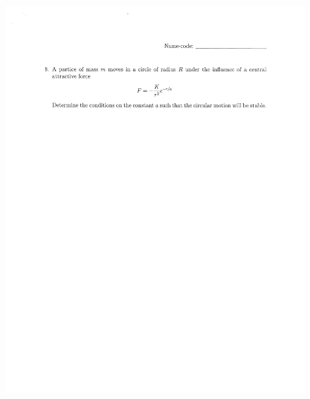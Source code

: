 \documentclass[10pt,a4paper]{article}
\begin{document}
\begin{figure}[H]
 \centering
 \includegraphics[width=16cm]{pdf/1-1T56.png}
\end{figure}
 \newpage
\end{document}
